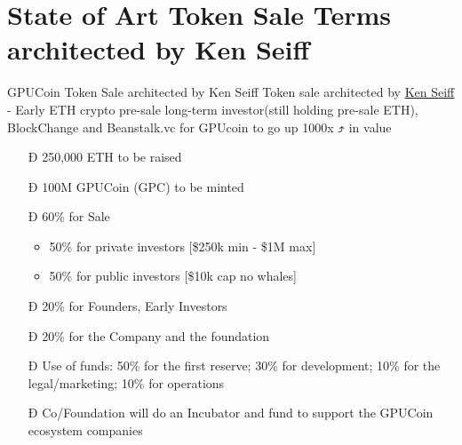 \section{State of Art Token Sale Terms architected by Ken Seiff}
\begin{frame}[fragile]{GPUCoin Token Sale architected by Ken Seiff}
Token sale architected by  \href{https://beanstalk.vc/}{\underline{Ken Seiff}} - Early ETH crypto pre-sale long-term investor(still holding pre-sale ETH), BlockChange and Beanstalk.vc for GPUcoin to go up 1000x ⤴ in value


 \begin{itemize}[<+-| alert@+>]%

\item[Ð]{250,000 ETH to be raised}
\item[Ð]100M GPUCoin (GPC) to be minted
\item[Ð]60\% for Sale
\begin{itemize}[<+-| alert@+>]
\item 50\% for private investors [\$250k min - \$1M max]
\item 50\% for public investors [\$10k cap no whales]
\end{itemize}
\item[Ð]{20\% for Founders, Early Investors}
\item[Ð]{20\% for the Company and the foundation}
\item[Ð]{Use of funds: 50\% for the first reserve; 30\% for development; 10\% for the legal/marketing; 10\% for operations}
\item[Ð]{Co/Foundation will do an Incubator and fund to support the GPUCoin ecosystem companies}
\end{itemize}

\end{frame}

